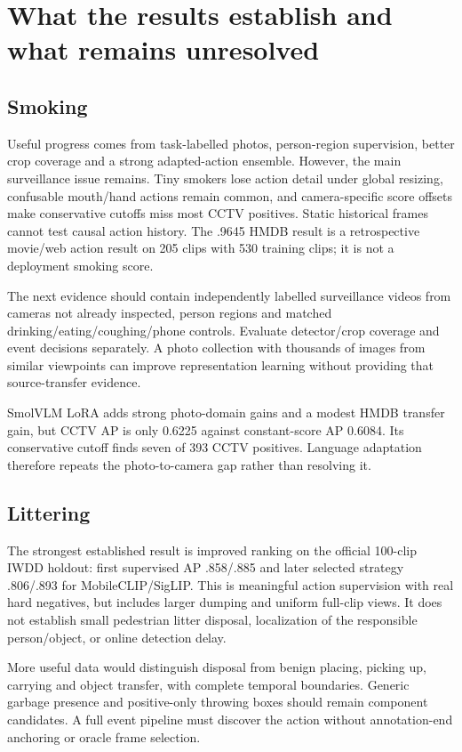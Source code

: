 \chapter{What the results establish and what remains unresolved}
\label{ch:interpretation}
\section{Smoking}
Useful progress comes from task-labelled photos, person-region supervision, better crop coverage and a strong adapted-action ensemble. However, the main surveillance issue remains. Tiny smokers lose action detail under global resizing, confusable mouth/hand actions remain common, and camera-specific score offsets make conservative cutoffs miss most CCTV positives. Static historical frames cannot test causal action history. The .9645 HMDB result is a retrospective movie/web action result on 205 clips with 530 training clips; it is not a deployment smoking score.

The next evidence should contain independently labelled surveillance videos from cameras not already inspected, person regions and matched drinking/eating/coughing/phone controls. Evaluate detector/crop coverage and event decisions separately. A photo collection with thousands of images from similar viewpoints can improve representation learning without providing that source-transfer evidence.

SmolVLM LoRA adds strong photo-domain gains and a modest HMDB transfer gain, but CCTV AP is only 0.6225 against constant-score AP 0.6084. Its conservative cutoff finds seven of 393 CCTV positives. Language adaptation therefore repeats the photo-to-camera gap rather than resolving it.

\section{Littering}
The strongest established result is improved ranking on the official 100-clip IWDD holdout: first supervised AP .858/.885 and later selected strategy .806/.893 for MobileCLIP/SigLIP. This is meaningful action supervision with real hard negatives, but includes larger dumping and uniform full-clip views. It does not establish small pedestrian litter disposal, localization of the responsible person/object, or online detection delay.

More useful data would distinguish disposal from benign placing, picking up, carrying and object transfer, with complete temporal boundaries. Generic garbage presence and positive-only throwing boxes should remain component candidates. A full event pipeline must discover the action without annotation-end anchoring or oracle frame selection.

